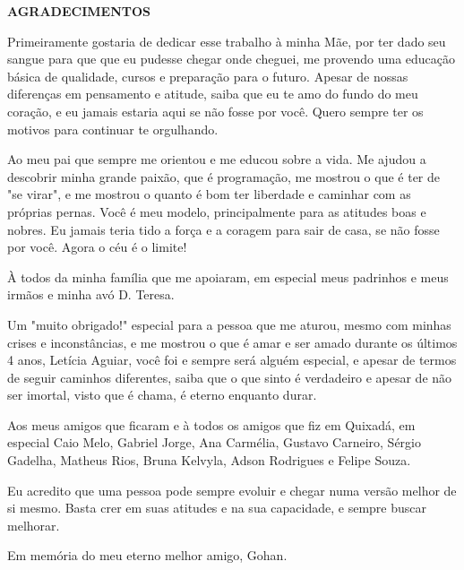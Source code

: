 
\begin{center}
	\bfseries\MakeUppercase{AGRADECIMENTOS}\par
\end{center}
	
Primeiramente gostaria de dedicar esse trabalho à minha Mãe, por ter dado seu sangue para que que eu pudesse chegar onde cheguei, me provendo uma educação básica de qualidade, cursos e preparação para o futuro. Apesar de nossas diferenças em pensamento e atitude, saiba que eu te amo do fundo do meu coração, e eu jamais estaria aqui se não fosse por você. Quero sempre ter os motivos para continuar te orgulhando.

Ao meu pai que sempre me orientou e me educou sobre a vida. Me ajudou a descobrir minha grande paixão, que é programação, me mostrou o que é ter de "se virar", e me mostrou o quanto é bom ter liberdade e caminhar com as próprias pernas. Você é meu modelo, principalmente para as atitudes boas e nobres. Eu jamais teria tido a força e a coragem para sair de casa, se não fosse por você. Agora o céu é o limite!

À todos da minha família que me apoiaram, em especial meus padrinhos e meus irmãos e minha avó D. Teresa.

Um "muito obrigado!" especial para a pessoa que me aturou, mesmo com minhas crises e inconstâncias, e me mostrou o que é amar e ser amado durante os últimos 4 anos, Letícia Aguiar, você foi e sempre será alguém especial, e apesar de termos de seguir caminhos diferentes, saiba que o que sinto é verdadeiro e apesar de não ser imortal, visto que é chama, é eterno enquanto durar. %

Aos meus amigos que ficaram e à todos os amigos que fiz em Quixadá, em especial Caio Melo, Gabriel Jorge, Ana Carmélia, Gustavo Carneiro, Sérgio Gadelha, Matheus Rios, Bruna Kelvyla, Adson Rodrigues e Felipe Souza.

Eu acredito que uma pessoa pode sempre evoluir e chegar numa versão melhor de si mesmo. Basta crer em suas atitudes e na sua capacidade, e sempre buscar melhorar.

Em memória do meu eterno melhor amigo, Gohan.
